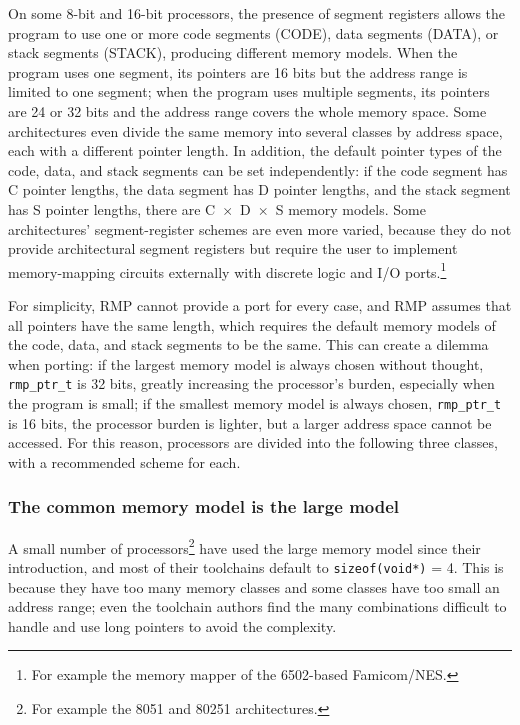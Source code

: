 On some 8-bit and 16-bit processors, the presence of segment registers allows the program to use one or more code segments (CODE), data segments (DATA), or stack segments (STACK), producing different memory models.
When the program uses one segment, its pointers are 16 bits but the address range is limited to one segment; when the program uses multiple segments, its pointers are 24 or 32 bits and the address range covers the whole memory space.
Some architectures even divide the same memory into several classes by address space, each with a different pointer length.
In addition, the default pointer types of the code, data, and stack segments can be set independently: if the code segment has C pointer lengths, the data segment has D pointer lengths, and the stack segment has S pointer lengths, there are C~$\times$~D~$\times$~S memory models.
Some architectures' segment-register schemes are even more varied, because they do not provide architectural segment registers but require the user to implement memory-mapping circuits externally with discrete logic and I/O ports.\footnote{For example the memory mapper of the 6502-based Famicom/NES.}

For simplicity, RMP cannot provide a port for every case, and RMP assumes that all pointers have the same length, which requires the default memory models of the code, data, and stack segments to be the same.
This can create a dilemma when porting: if the largest memory model is always chosen without thought, \texttt{rmp\_ptr\_t} is 32 bits, greatly increasing the processor's burden, especially when the program is small; if the smallest memory model is always chosen, \texttt{rmp\_ptr\_t} is 16 bits, the processor burden is lighter, but a larger address space cannot be accessed.
For this reason, processors are divided into the following three classes, with a recommended scheme for each.

\subsubsection{The common memory model is the large model}

A small number of processors\footnote{For example the 8051 and 80251 architectures.} have used the large memory model since their introduction, and most of their toolchains default to \texttt{sizeof(void*)} = 4.
This is because they have too many memory classes and some classes have too small an address range; even the toolchain authors find the many combinations difficult to handle and use long pointers to avoid the complexity.

